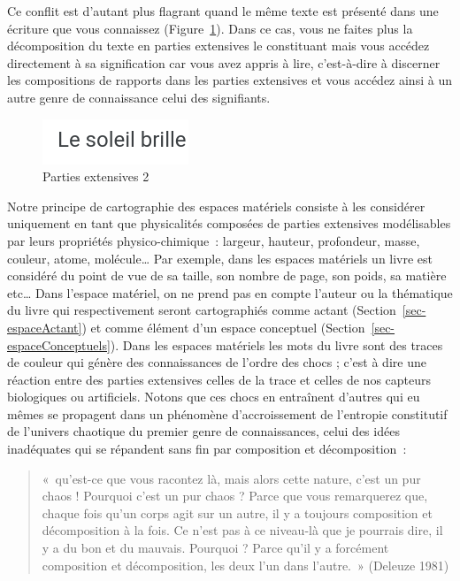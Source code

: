 \documentclass[
  letterpaper,
  DIV=11,
  numbers=noendperiod]{scrreprt}
\begin{document}
Ce conflit est d'autant plus flagrant quand le même texte est présenté
dans une écriture que vous connaissez (Figure~\ref{fig-partExt2}). Dans
ce cas, vous ne faites plus la décomposition du texte en parties
extensives le constituant mais vous accédez directement à sa
signification car vous avez appris à lire, c'est-à-dire à discerner les
compositions de rapports dans les parties extensives et vous accédez
ainsi à un autre genre de connaissance celui des signifiants.

\begin{figure}

{\centering \includegraphics{media/10000001000000A500000033DA0B4C29741E4F62.png}

}

\caption{\label{fig-partExt2}Parties extensives 2}

\end{figure}

Notre principe de cartographie des espaces matériels consiste à les
considérer uniquement en tant que physicalités composées de parties
extensives modélisables par leurs propriétés physico-chimique~: largeur,
hauteur, profondeur, masse, couleur, atome, molécule\ldots{} Par
exemple, dans les espaces matériels un livre est considéré du point de
vue de sa taille, son nombre de page, son poids, sa matière etc\ldots{}
Dans l'espace matériel, on ne prend pas en compte l'auteur ou la
thématique du livre qui respectivement seront cartographiés comme actant
(Section~\ref{sec-espaceActant}) et comme élément d'un espace conceptuel
(Section~\ref{sec-espaceConceptuels}). Dans les espaces matériels les
mots du livre sont des traces de couleur qui génère des connaissances de
l'ordre des chocs ; c'est à dire une réaction entre des parties
extensives celles de la trace et celles de nos capteurs biologiques ou
artificiels. Notons que ces chocs en entraînent d'autres qui eu mêmes se
propagent dans un phénomène d'accroissement de l'entropie constitutif de
l'univers chaotique du premier genre de connaissances, celui des idées
inadéquates qui se répandent sans fin par composition et décomposition~:

\begin{quote}
«~qu'est-ce que vous racontez là, mais alors cette nature, c'est un pur
chaos ! Pourquoi c'est un pur chaos ? Parce que vous remarquerez que,
chaque fois qu'un corps agit sur un autre, il y a toujours composition
et décomposition à la fois. Ce n'est pas à ce niveau-là que je pourrais
dire, il y a du bon et du mauvais. Pourquoi ? Parce qu'il y a forcément
composition et décomposition, les deux l'un dans l'autre.~» (Deleuze
1981)
\end{quote}
\end{document}
